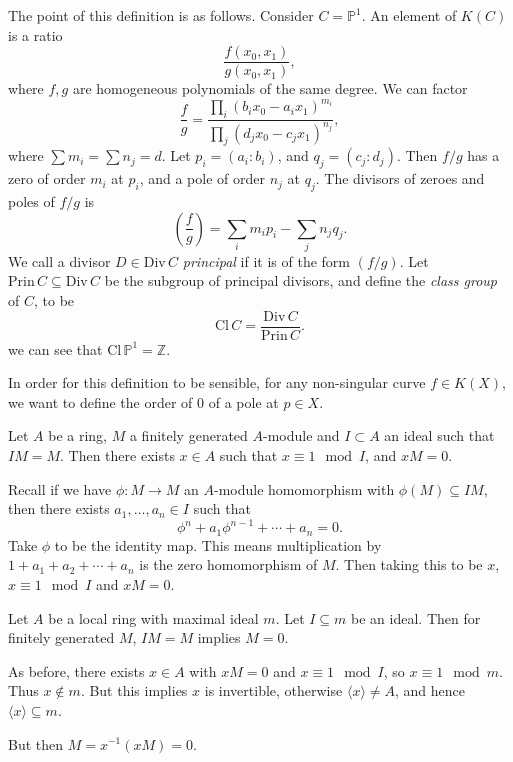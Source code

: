 \documentclass[12pt]{article}
\begin{document}
The point of this definition is as follows. Consider $C = \mathbb{P}^1$. An element of $K(C)$ is a ratio
\[
\frac{f(x_0, x_1)}{g(x_0, x_1)},
\]
where $f, g$ are homogeneous polynomials of the same degree. We can factor
\[
	\frac{f}{g} = \frac{\prod_i (b_i x_0 - a_i x_1)^{m_i}}{\prod_j (d_j x_0 - c_j x_1)^{n_j}},
\]
where $\sum m_i = \sum n_j = d$. Let $p_i = (a_i : b_i)$, and $q_j = (c_j : d_j)$. Then $f/g$ has a zero of order $m_i$ at $p_i$, and a pole of order $n_j$ at $q_j$. The divisors of zeroes and poles of $f/g$ is
\[
	\left( \frac{f}{g} \right) = \sum_{i} m_i p_i - \sum_j n_j q_j.
\]
We call a divisor $D \in \mathrm{Div} \, C$ \emph{principal} if it is of the form $(f/g)$. Let $\mathrm{Prin}\, C \subseteq \mathrm{Div}\, C$ be the subgroup of principal divisors, and define the \emph{class group} of $C$, to be
\[
\mathrm{Cl}\, C = \frac{\mathrm{Div}\, C}{\mathrm{Prin}\, C}.
\]
we can see that $\mathrm{Cl}\, \mathbb{P}^1 = \mathbb{Z}$.

In order for this definition to be sensible, for any non-singular curve $f \in K(X)$, we want to define the order of $0$ of a pole at $p \in X$.

\begin{lemma}
	Let $A$ be a ring, $M$ a finitely generated $A$-module and $I \subset A$ an ideal such that $I M = M$. Then there exists $x \in A$ such that $x \equiv 1 \mod I$, and $x M = 0$.
\end{lemma}

\begin{proofbox}
	Recall if we have $\phi : M \to M$ an $A$-module homomorphism with $\phi(M) \subseteq IM$, then there exists $a_1, \ldots, a_n \in I$ such that
	\[
	\phi^n + a_1 \phi^{n-1} + \cdots + a_n = 0.
	\]
	Take $\phi$ to be the identity map. This means multiplication by $1 + a_1 + a_2 + \cdots + a_n$ is the zero homomorphism of $M$. Then taking this to be $x$, $x \equiv 1 \mod I$ and $x M = 0$.
\end{proofbox}

\begin{theorem}
	Let $A$ be a local ring with maximal ideal $m$. Let $I \subseteq m$ be an ideal. Then for finitely generated $M$, $I M = M$ implies $M = 0$.
\end{theorem}

\begin{proofbox}
	As before, there exists $x \in A$ with $x M = 0$ and $x \equiv 1 \mod I$, so $x \equiv 1 \mod m$. Thus $x \not \in m$. But this implies $x$ is invertible, otherwise $\langle x \rangle \neq A$, and hence $\langle x \rangle \subseteq m$.

	But then $M = x^{-1}( x M) = 0$.
\end{proofbox}
\end{document}
